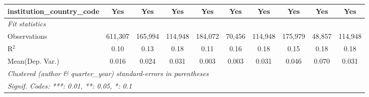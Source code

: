 \begin{tabular}{lccccccccc}
   institution\_country\_code             & Yes           & Yes           & Yes           & Yes          & Yes          & Yes           & Yes           & Yes           & Yes\\  
   \midrule
   \emph{Fit statistics}\\
   Observations                           & 611,307       & 165,994       & 114,948       & 184,072      & 70,456       & 114,948       & 175,979       & 48,857        & 114,948\\  
   R$^2$                                  & 0.10          & 0.13          & 0.18          & 0.11         & 0.16         & 0.18          & 0.15          & 0.18          & 0.18\\  
Mean(Dep. Var.) & 0.016 & 0.024 & 0.031 & 0.003 & 0.003 & 0.031 & 0.046 & 0.070 & 0.031 \\
   \midrule \midrule
   \multicolumn{10}{l}{\emph{Clustered (author \& quarter\_year) standard-errors in parentheses}}\\
   \multicolumn{10}{l}{\emph{Signif. Codes: ***: 0.01, **: 0.05, *: 0.1}}\\
\end{tabular}
\par\endgroup
